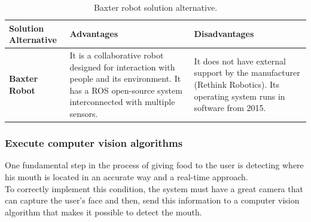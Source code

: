\documentclass[11pt]{report} %
\begin{document}
\begin{table}[H]
\begin{center}
    \begin{tabular}{M{6.6cm}M{3.3cm}M{3.3cm}}
    \hline
    \textbf{Solution Alternative} & \textbf{Advantages} & \textbf{Disadvantages} \\ 
    \hline
    
    \textbf{Baxter Robot}

    
    \citep{cite_rethink_robotics_baxter_factory_worker}

    &

    It is a collaborative robot designed for interaction with people and its environment. It has a ROS open-source system interconnected with multiple sensors.

    &

    It does not have external support by the manufacturer (Rethink Robotics). Its operating system runs in  software from 2015.

    \\ \hline
    \end{tabular}
\caption{\label{tab:baxter} Baxter robot solution alternative.}
\end{center}
\end{table}

\subsubsection{Execute computer vision algorithms}

One fundamental step in the process of giving food to the user is detecting where his mouth is located in an accurate way and a real-time approach.\\

To correctly implement this condition, the system must have a great camera that can capture the user's face and then, send this information to a computer vision algorithm that makes it possible to detect the mouth.\\
\end{document}
